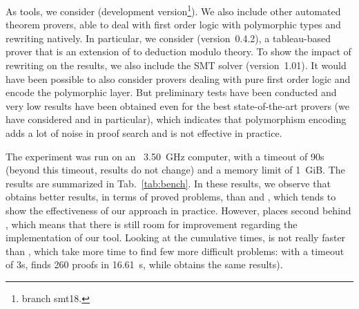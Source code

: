 As tools, we consider \archsat{} (development version\footnote{\git{}
branch smt18.}). We also include other automated theorem provers, able to
deal with first order logic with polymorphic types and rewriting natively. In
particular, we consider \zenm{} (version~0.4.2), a tableau-based prover that
is an extension of \zenon{} to deduction modulo theory. To show the impact of
rewriting on the results, we also include the \altergo{} SMT solver
(version~1.01). It would have been possible to also consider provers dealing
with pure first order logic and encode the polymorphic layer. But preliminary
tests have been conducted and very low results have been obtained even for the
best state-of-the-art provers (we have considered \e{} and \cvc{} in
particular), which indicates that polymorphism encoding adds a lot of noise
in proof search and is not effective in practice.

The experiment was run on an \intel{}~3.50~GHz computer, with a timeout of 90s
(beyond this timeout, results do not change) and a memory limit of 1~GiB. The
results are summarized in Tab.~\ref{tab:bench}. In these results, we observe
that \archsat{} obtains better results, in terms of proved problems, than
\zenm{} and \altergo{}, which tends to show the effectiveness of our approach in
practice. However, \archsat{} places second behind \zipper{}, which means that
there is still room for improvement regarding the implementation of our tool.
Looking at the cumulative times, \altergo{} is not really faster than
\archsat{}, which take more time to find few more difficult
problems: with a timeout of 3s, \archsat{} finds 260 proofs in 16.61~s,
while \altergo{} obtains the same results).

\setlength{\tabcolsep}{3pt}
\renewcommand{\arraystretch}{1.2}

